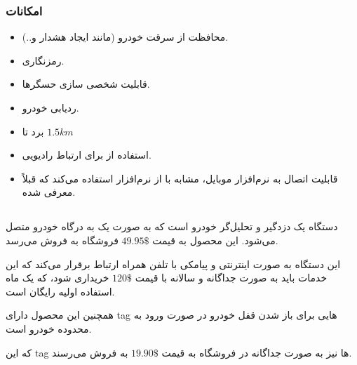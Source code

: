 \documentclass[a4paper,12pt]{report}
\begin{document}
	\subsubsection{
		امکانات
	}\label{subsubsec1:subsec2:sec3:chap1}
	\begin{itemize}[nosep]\label{item1:subsec2:sec3:chap1}
		\item
		محافظت از سرقت خودرو (مانند ایجاد هشدار و..).
		\item
		رمزنگاری.
		\item
		قابلیت شخصی سازی حسگر‌ها.
		\item
		ردیابی خودرو.
		\item
		برد
		تا
		$1.5 km$
		\item
		استفاده از
		برای ارتباط رادیویی.
		\item
		قابلیت اتصال به نرم‌افزار موبایل، مشابه با
		از نرم‌افزار
		استفاده می‌کند که قبلاً معرفی شده.
	\end{itemize}

	\subsection{
	}\label{subsec3:sec3:chap1}
	دستگاه
	یک دزدگیر و تحلیل‌گر خودرو است که به صورت یک
	به درگاه
	خودرو متصل می‌شود.
	این محصول به قیمت
	$49.95\$$
	فروشگاه
	\hyperref{https://www.amazon.com/gp/product/B00U0K3Q10}{car alarm}{carlock}{}
	به فروش می‌رسد.

	این دستگاه به صورت اینترنتی و پیامکی با تلفن ‌همراه ارتباط برقرار می‌کند که این خدمات باید به صورت جداگانه و سالانه با قیمت
	$120\$$
	خریداری شود، که یک ماه استفاده اولیه رایگان است.

	همچنین این محصول دارای
	tag
	هایی برای باز شدن قفل خودرو در صورت ورود به محدوده خودرو است.

	که این
	tag
	ها نیز به صورت جداگانه در فروشگاه
	\hyperref{https://www.amazon.com/CARLOCK-TAG-Accessory-ONLY-Automatically/dp/B075F4SWZ7}{car alarm}{carlocktag}{}
	به قیمت
	$19.90\$$
	به فروش می‌رسند.
	\cite{carAlarm:online}
\end{document}
